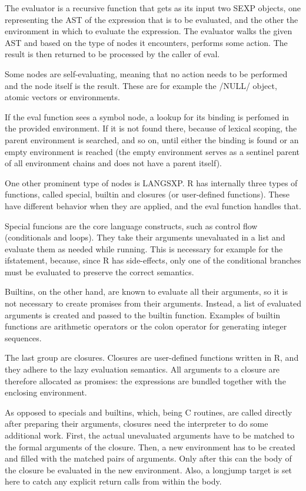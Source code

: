 {The evaluator is a recursive function that gets as its input two SEXP objects, one representing the AST of the expression that is to be evaluated, and the other the environment in which to evaluate the expression. The evaluator walks the given AST and based on the type of nodes it encounters, performs some action. The result is then returned to be processed by the caller of eval.

Some nodes are self-evaluating, meaning that no action needs to be performed and the node itself is the result. These are for example the \rinline/NULL/ object, atomic vectors or environments.

If the eval function sees a symbol node, a lookup for its binding is perfomed in the provided environment. If it is not found there, because of lexical scoping, the parent environment is searched, and so on, until either the binding is found or an empty environment is reached (the empty environment serves as a sentinel parent of all environment chains and does not have a parent itself).

One other prominent type of nodes is LANGSXP. R has internally three types of functions, called special, builtin and closures (or user-defined functions). These have different behavior when they are applied, and the eval function handles that.

Special funcions are the core language constructs, such as control flow (conditionals and loops). They take their arguments unevaluated in a list and evaluate them as needed while running. This is necessary for example for the if\todo[verb] statement, because, since R has side-effects, only one of the conditional branches must be evaluated to preserve the correct semantics.

Builtins, on the other hand, are known to evaluate all their arguments, so it is not necessary to create promises from their arguments. Instead, a list of evaluated arguments is created and passed to the builtin function. Examples of builtin functions are arithmetic operators or the colon operator for generating integer sequences.

The last group are closures. Closures are user-defined functions written in R, and they adhere to the lazy evaluation semantics. All arguments to a closure are therefore allocated as promises: the expressions are bundled together with the enclosing environment.

As opposed to specials and builtins, which, being C routines, are called directly after preparing their arguments, closures need the interpreter to do some additional work. First, the actual unevaluated arguments have to be matched to the formal arguments of the closure. Then, a new environment has to be created and filled with the matched pairs of arguments. Only after this can the body of the closure be evaluated in the new environment. Also, a longjump target is set here to catch any explicit return calls from within the body.

}
